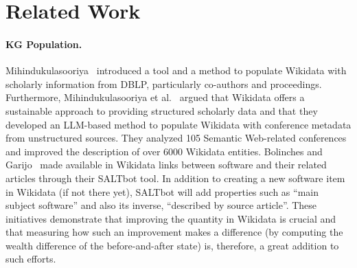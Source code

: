 



\section{Related Work}

\paragraph{KG Population.}
Mihindukulasooriya~\cite{Mihindukulasooriya24} introduced a tool and a method to populate Wikidata with scholarly information from DBLP, particularly co-authors and proceedings.
Furthermore, Mihindukulasooriya et al.~\cite{MihindukulasooriyaTDNCP24} argued that Wikidata offers a sustainable approach to providing structured scholarly data and 
that they developed an LLM-based method to populate Wikidata with conference metadata from unstructured sources.
They analyzed 105 Semantic Web-related conferences and 
improved the description of over 6000 Wikidata entities.
Bolinches and Garijo~\cite{BolinchesG23} made available in Wikidata
links between software and their related articles through their SALTbot tool.
In addition to creating a new software item in Wikidata (if not there yet),
SALTbot will add properties such as ``main subject software''
and also its inverse, ``described by source article''.
These initiatives demonstrate that
improving the quantity in Wikidata is crucial and that
measuring how such an improvement makes a difference
(by computing the wealth difference of the before-and-after state) is,
therefore, a great addition to such efforts.


